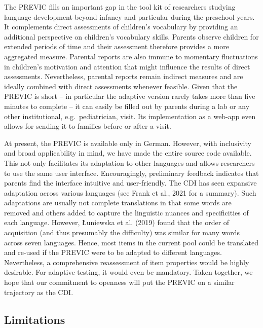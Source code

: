 \documentclass[
  man,floatsintext]{apa6}
\begin{document}
The PREVIC fills an important gap in the tool kit of researchers studying language development beyond infancy and particular during the preschool years. It complements direct assessments of children's vocabulary by providing an additional perspective on children's vocabulary skills. Parents observe children for extended periods of time and their assessment therefore provides a more aggregated measure. Parental reports are also immune to momentary fluctuations in children's motivation and attention that might influence the results of direct assessments. Nevertheless, parental reports remain indirect measures and are ideally combined with direct assessments whenever feasible. Given that the PREVIC is short -- in particular the adaptive version rarely takes more than five minutes to complete -- it can easily be filled out by parents during a lab or any other institutional, e.g.~pediatrician, visit. Its implementation as a web-app even allows for sending it to families before or after a visit.

At present, the PREVIC is available only in German. However, with inclusivity and broad applicability in mind, we have made the entire source code available. This not only facilitates its adaptation to other languages and allows researchers to use the same user interface. Encouragingly, preliminary feedback indicates that parents find the interface intuitive and user-friendly. The CDI has seen expansive adaptation across various languages (see Frank et al., 2021 for a summary). Such adaptations are usually not complete translations in that some words are removed and others added to capture the linguistic nuances and specificities of each language. However, Łuniewska et al. (2019) found that the order of acquisition (and thus presumably the difficulty) was similar for many words across seven languages. Hence, most items in the current pool could be translated and re-used if the PREVIC were to be adapted to different languages. Nevertheless, a comprehensive reassessment of item properties would be highly desirable. For adaptive testing, it would even be mandatory. Taken together, we hope that our commitment to openness will put the PREVIC on a similar trajectory as the CDI.

\hypertarget{limitations}{%
\subsection{Limitations}\label{limitations}}
\end{document}
